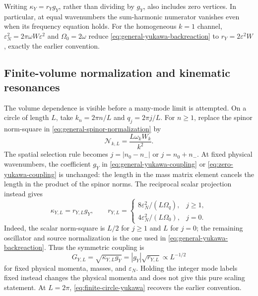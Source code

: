 \documentclass[11pt,a4paper,oneside]{book}
\theoremstyle{plain}
\theoremstyle{definition}
\theoremstyle{remark}
\newcommand{\src}[2]{\cite{#1}}
\begin{document}
Writing $\kappa_Y=r_Yg_Y$, rather than dividing by $g_Y$, also includes
zero vertices.  In particular, at equal wavenumbers the sum-harmonic
numerator vanishes even when its frequency equation holds.  For the
homogeneous $k=1$ channel,
$\varepsilon_N^2=2\pi\omega W\varepsilon^2$ and $\Omega_0=2\omega$
reduce \eqref{eq:general-yukawa-backreaction} to
$r_Y=2\varepsilon^2W$, exactly the earlier convention.

\subsection{Finite-volume normalization and kinematic resonances}
\label{sec:finite-volume-triads}
The volume dependence is visible before a many-mode limit is attempted.
On a circle of length $L$, take $k_n=2\pi n/L$ and $q_j=2\pi j/L$.
For $n\ge1$, replace the spinor norm-square in
\eqref{eq:general-spinor-normalization} by
\begin{equation}
 \mathcal N_{k,L}=\frac{L\omega_kW_k}{k^2}.
 \label{eq:finite-circle-spinor-norm}
\end{equation}
The spatial selection rule becomes $j=|n_0-n_-|$ or $j=n_0+n_-$.
At fixed physical wavenumbers, the coefficient $g_Y$ in
\eqref{eq:general-yukawa-coupling} or
\eqref{eq:zero-yukawa-coupling} is unchanged: the length in the mass
matrix element cancels the length in the product of the spinor norms.
The reciprocal scalar projection instead gives
\begin{equation}
 \kappa_{Y,L}=r_{Y,L}g_Y,\qquad
 r_{Y,L}=\begin{cases}
 8\varepsilon_N^2/(L\Omega_q),&j\ge1,\\
 4\varepsilon_N^2/(L\Omega_0),&j=0.
 \end{cases}
 \label{eq:finite-circle-yukawa}
\end{equation}
Indeed, the scalar norm-square is $L/2$ for $j\ge1$ and $L$ for $j=0$;
the remaining oscillator and source normalization is the one used in
\eqref{eq:general-yukawa-backreaction}.  Thus the symmetric coupling is
\begin{equation}
 G_{Y,L}=\sqrt{\kappa_{Y,L}g_Y}=|g_Y|\sqrt{r_{Y,L}}
             \propto L^{-1/2}
 \label{eq:finite-circle-coupling-scale}
\end{equation}
for fixed physical momenta, masses, and $\varepsilon_N$.  Holding the
integer mode labels fixed instead changes the physical momenta and does
not give this pure scaling statement.  At $L=2\pi$,
\eqref{eq:finite-circle-yukawa} recovers the earlier convention.
\src{R20}{thm:v20v41-scalings}
\end{document}

